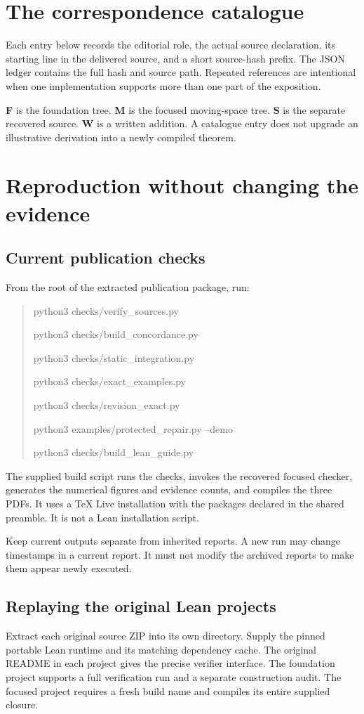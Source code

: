 \documentclass[11pt]{article}
\begin{document}
\clearpage\section{The correspondence catalogue}
Each entry below records the editorial role, the actual source declaration, its starting line in the delivered source, and a short source-hash prefix. The JSON ledger contains the full hash and source path. Repeated references are intentional when one implementation supports more than one part of the exposition.

\textbf{F} is the foundation tree. \textbf{M} is the focused moving-space tree. \textbf{S} is the separate recovered source. \textbf{W} is a written addition. A catalogue entry does not upgrade an illustrative derivation into a newly compiled theorem.


\clearpage\section{Reproduction without changing the evidence}
\subsection{Current publication checks}
From the root of the extracted publication package, run:
\begin{quote}\small\ttfamily
python3 checks/verify\_sources.py\par
python3 checks/build\_concordance.py\par
python3 checks/static\_integration.py\par
python3 checks/exact\_examples.py\par
python3 checks/revision\_exact.py\par
python3 examples/protected\_repair.py --demo\par
python3 checks/build\_lean\_guide.py
\end{quote}
The supplied build script runs the checks, invokes the recovered focused checker, generates the numerical figures and evidence counts, and compiles the three PDFs. It uses a TeX Live installation with the packages declared in the shared preamble. It is not a Lean installation script.

Keep current outputs separate from inherited reports. A new run may change timestamps in a current report. It must not modify the archived reports to make them appear newly executed.

\subsection{Replaying the original Lean projects}
Extract each original source ZIP into its own directory. Supply the pinned portable Lean runtime and its matching dependency cache. The original README in each project gives the precise verifier interface. The foundation project supports a full verification run and a separate construction audit. The focused project requires a fresh build name and compiles its entire supplied closure.
\end{document}
